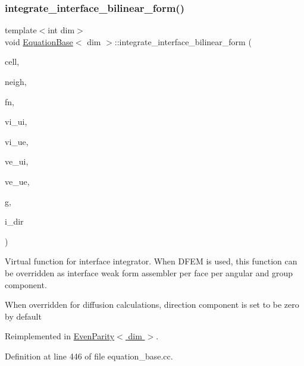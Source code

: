 \subsubsection{\texorpdfstring{integrate\+\_\+interface\+\_\+bilinear\+\_\+form()}{integrate\_interface\_bilinear\_form()}}
{\footnotesize\ttfamily template$<$int dim$>$ \\
void \hyperlink{class_equation_base}{Equation\+Base}$<$ dim $>$\+::integrate\+\_\+interface\+\_\+bilinear\+\_\+form (\begin{DoxyParamCaption}\item[{typename Do\+F\+Handler$<$ dim $>$\+::active\+\_\+cell\+\_\+iterator \&}]{cell,  }\item[{typename Do\+F\+Handler$<$ dim $>$\+::cell\+\_\+iterator \&}]{neigh,  }\item[{unsigned int \&}]{fn,  }\item[{Full\+Matrix$<$ double $>$ \&}]{vi\+\_\+ui,  }\item[{Full\+Matrix$<$ double $>$ \&}]{vi\+\_\+ue,  }\item[{Full\+Matrix$<$ double $>$ \&}]{ve\+\_\+ui,  }\item[{Full\+Matrix$<$ double $>$ \&}]{ve\+\_\+ue,  }\item[{const unsigned int \&}]{g,  }\item[{const unsigned int \&}]{i\+\_\+dir }\end{DoxyParamCaption})\hspace{0.3cm}{\ttfamily [virtual]}}



Virtual function for interface integrator. When D\+F\+EM is used, this function can be overridden as interface weak form assembler per face per angular and group component. 

When overridden for diffusion calculations, direction component is set to be zero by default 

Reimplemented in \hyperlink{class_even_parity_a0a6674c14f34f22c8ff383aee81ffabf}{Even\+Parity$<$ dim $>$}.



Definition at line 446 of file equation\+\_\+base.\+cc.

\mbox{\label{class_equation_base_aca5998c1afd2b89ee93d3fbbfde7f3d0}} 
